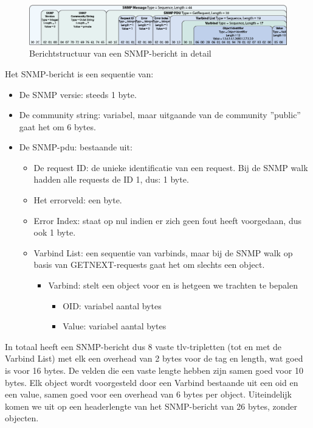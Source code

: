 \begin{figure}[h]
	\centering
	\includegraphics[scale=0.40]{figures/snmp/berichtstructuur-3}
	\caption{Berichtstructuur van een SNMP-bericht in detail}
	\label{fig-berichtstructuur-4}
\end{figure}


Het SNMP-bericht is een sequentie van:

\begin{itemize}
	\item De SNMP versie: steeds 1 byte.
	\item De community string: variabel, maar uitgaande van de community ''public'' gaat het om 6 bytes.
	\item De SNMP-\gls{pdu}: bestaande uit:
		\begin{itemize}
			\item De request ID: de unieke identificatie van een request.
				Bij de SNMP walk hadden alle requests de ID 1, dus: 1 byte.
			\item Het errorveld: een byte.
			\item Error Index: staat op nul indien er zich geen fout heeft voorgedaan, dus ook 1 byte.
			\item Varbind List: een sequentie van varbinds, maar bij de SNMP walk op basis van GETNEXT-requests gaat het om slechts een object.
				\begin{itemize}
					\item Varbind: stelt een object voor en is hetgeen we trachten te bepalen
						\begin{itemize}
							\item OID: variabel aantal bytes
							\item Value: variabel aantal bytes
						\end{itemize}
				\end{itemize}
		\end{itemize}
\end{itemize}

In totaal heeft een SNMP-bericht dus 8 vaste \gls{tlv}-tripletten (tot en met de Varbind List) met elk een overhead van 2 bytes voor de tag en length,
wat goed is voor 16 bytes.
De velden die een vaste lengte hebben zijn samen goed voor 10 bytes.
Elk object wordt voorgesteld door een Varbind bestaande uit een \gls{oid} en een value, samen goed voor een overhead van 6 bytes per object.
Uiteindelijk komen we uit op een headerlengte van het SNMP-bericht van 26 bytes, zonder objecten.

